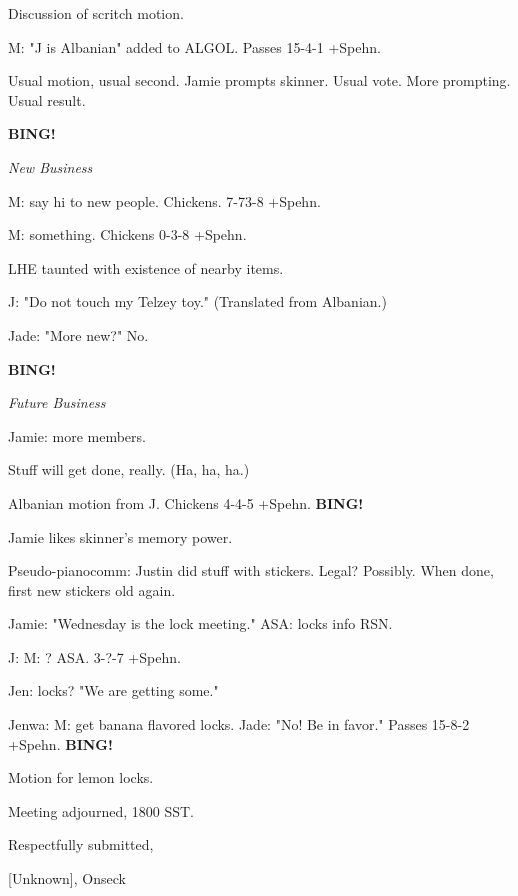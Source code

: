\documentclass[12pt]{article}
\newcommand{\bing}{{\bf BING!} }
\newcommand{\goto}[1]{\bing \vskip 12pt \centerline{{\em{#1}}}}
\begin{document}
Discussion of scritch motion.

M: "J is Albanian" added to ALGOL. Passes 15-4-1 +Spehn.

Usual motion, usual second. Jamie prompts skinner. Usual vote. More prompting. Usual result.

\goto{New Business}

M: say hi to new people. Chickens. 7-73-8 +Spehn.

M: something. Chickens 0-3-8 +Spehn.

LHE taunted with existence of nearby items.

J: "Do not touch my Telzey toy." (Translated from Albanian.)

Jade: "More new?" No.

\goto{Future Business}

Jamie: more members.

Stuff will get done, really. (Ha, ha, ha.)

Albanian motion from J. Chickens 4-4-5 +Spehn. \bing

Jamie likes skinner's memory power.

Pseudo-pianocomm: Justin did stuff with stickers. Legal? Possibly. When done, first new stickers old again.

Jamie: "Wednesday is the lock meeting." ASA: locks info RSN.

J: M: ? ASA. 3-?-7 +Spehn.

Jen: locks? "We are getting some."

Jenwa: M: get banana flavored locks. Jade: "No! Be in favor." Passes 15-8-2 +Spehn. \bing

Motion for lemon locks.

\vspace{12pt}

\noindent
Meeting adjourned, 1800 SST.

\vspace{18pt}

\centerline{Respectfully submitted,}
\centerline{[Unknown], Onseck}
\end{document}
